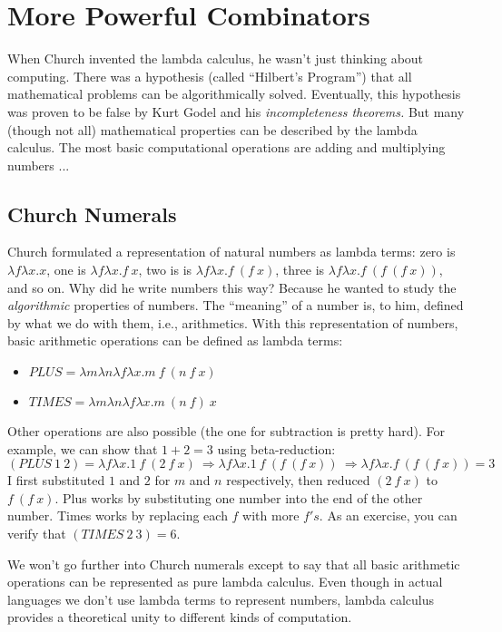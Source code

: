 \section{More Powerful Combinators}

When Church invented the lambda calculus, he wasn't just thinking about computing.
There was a hypothesis (called ``Hilbert's Program'') that all mathematical
problems can be algorithmically solved.  Eventually, this hypothesis was proven
to be false by Kurt Godel and his {\em incompleteness theorems.\/}  But
many (though not all) mathematical properties can be described by the
lambda calculus.  The most basic computational operations are adding and
multiplying numbers ...

\subsection{Church Numerals}

Church formulated a representation of natural numbers as lambda terms:
zero is $\lambda f\lambda x.x$, one is $\lambda f\lambda x.f~x$, two is
is $\lambda f\lambda x. f~(f~x)$, three is $\lambda f\lambda x. f~(f~(f~x))$, and
so on.  Why did he write numbers this way?  Because he wanted to study
the {\em algorithmic\/} properties of numbers.  The ``meaning'' of a number
is, to him, defined by what we do with them, i.e., arithmetics. 
With this representation of numbers, basic arithmetic operations can be defined as lambda terms:
\begin{itemize}
\item $PLUS = \lambda m\lambda n\lambda f\lambda x.m~f~(n~f~x)$
\item $TIMES = \lambda m\lambda n\lambda f\lambda x.m~(n~f)~x$
\end{itemize}
Other operations are also possible (the one for subtraction is pretty hard).
For example, we can show that $1+2=3$ using beta-reduction:
$$(PLUS~1~2) = \lambda f\lambda x. 1~ f~(2 ~ f~x) ~\Rightarrow
\lambda f\lambda x. 1~f~(f~(f~x)) ~\Rightarrow
\lambda f\lambda x. f~(f~(f~x)) = 3$$
I first substituted $1$ and $2$ for $m$ and $n$ respectively, then
reduced $(2 ~ f~x)$ to
$f~(f~x)$.  Plus works by substituting one number into the end of the
other number.  Times works by replacing each $f$ with more $f's$.  As
an exercise, you can verify that $(TIMES~2~3)=6$.

We won't go further into Church numerals except to say that all basic
arithmetic operations can be represented as pure lambda calculus.  Even though
in actual languages we don't use lambda terms to represent numbers, lambda
calculus provides a theoretical unity to different kinds of computation.

